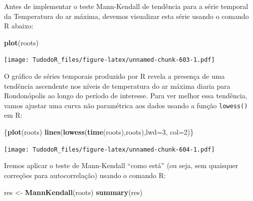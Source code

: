 \documentclass[
]{book}
\newenvironment{Shaded}{\begin{snugshade}}{\end{snugshade}}
\newcommand{\DataTypeTok}[1]{\textcolor[rgb]{0.13,0.29,0.53}{#1}}
\newcommand{\DecValTok}[1]{\textcolor[rgb]{0.00,0.00,0.81}{#1}}
\newcommand{\KeywordTok}[1]{\textcolor[rgb]{0.13,0.29,0.53}{\textbf{#1}}}
\newcommand{\NormalTok}[1]{#1}
\newcommand{\OperatorTok}[1]{\textcolor[rgb]{0.81,0.36,0.00}{\textbf{#1}}}
\newcommand{\StringTok}[1]{\textcolor[rgb]{0.31,0.60,0.02}{#1}}
\begin{document}
\begin{Shaded}
\end{Shaded}

Antes de implementar o teste Mann-Kendall de tendência para a série temporal da Temperatura do ar máxima, devemos visualizar esta série usando o comando R abaixo:

\begin{Shaded}
\begin{Highlighting}[]
\KeywordTok{plot}\NormalTok{(roots)}
\end{Highlighting}
\end{Shaded}

\texttt{[image: TudodoR\_files/figure-latex/unnamed-chunk-603-1.pdf]}

O gráfico de séries temporais produzido por R revela a presença de uma tendência ascendente nos níveis de temperatura do ar máxima diaria para Rondonópolis ao longo do período de interesse. Para ver melhor essa tendência, vamos ajustar uma curva não paramétrica aos dados usando a função \texttt{lowess()} em R:

\begin{Shaded}
\begin{Highlighting}[]
\NormalTok{\{}\KeywordTok{plot}\NormalTok{(roots)}
\KeywordTok{lines}\NormalTok{(}\KeywordTok{lowess}\NormalTok{(}\KeywordTok{time}\NormalTok{(roots),roots),}\DataTypeTok{lwd=}\DecValTok{3}\NormalTok{, }\DataTypeTok{col=}\DecValTok{2}\NormalTok{)\}}
\end{Highlighting}
\end{Shaded}

\texttt{[image: TudodoR\_files/figure-latex/unnamed-chunk-604-1.pdf]}

Iremos aplicar o teste de Mann-Kendall ``como está'' (ou seja, sem quaisquer correções para autocorrelação) usando o comando R:

\begin{Shaded}
\begin{Highlighting}[]
\NormalTok{res <-}\StringTok{ }\KeywordTok{MannKendall}\NormalTok{(roots)}
\KeywordTok{summary}\NormalTok{(res)}
\end{Highlighting}
\end{Shaded}
\end{document}
